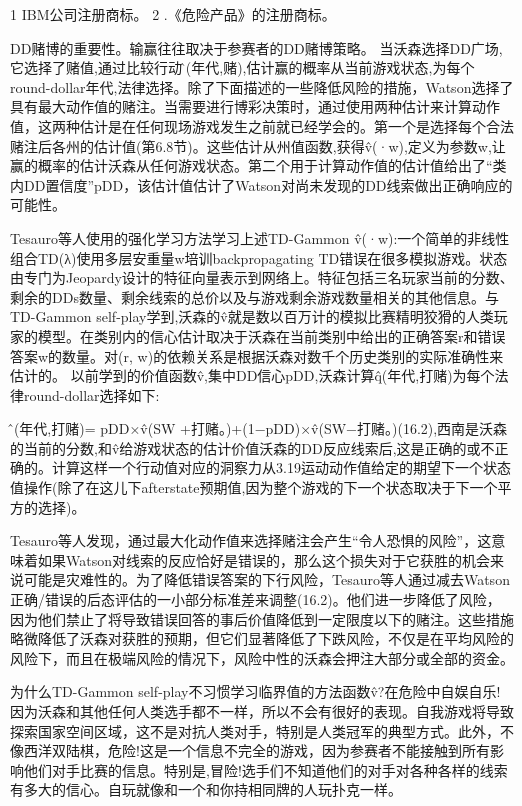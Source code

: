 1 IBM公司注册商标。
2 .《危险产品》的注册商标。

DD赌博的重要性。输赢往往取决于参赛者的DD赌博策略。
当沃森选择DD广场,它选择了赌值,通过比较行动问̂(年代,赌),估计赢的概率从当前游戏状态,为每个round-dollar年代,法律选择。除了下面描述的一些降低风险的措施，Watson选择了具有最大动作值的赌注。当需要进行博彩决策时，通过使用两种估计来计算动作值，这两种估计是在任何现场游戏发生之前就已经学会的。第一个是选择每个合法赌注后各州的估计值(第6.8节)。这些估计从州值函数,获得v̂(·w),定义为参数w,让赢的概率的估计沃森从任何游戏状态。第二个用于计算动作值的估计值给出了“类内DD置信度”pDD，该估计值估计了Watson对尚未发现的DD线索做出正确响应的可能性。

Tesauro等人使用的强化学习方法学习上述TD-Gammon v̂(·w):一个简单的非线性组合TD(λ)使用多层安重量w培训backpropagating TD错误在很多模拟游戏。状态由专门为Jeopardy设计的特征向量表示到网络上。特征包括三名玩家当前的分数、剩余的DDs数量、剩余线索的总价以及与游戏剩余游戏数量相关的其他信息。与TD-Gammon self-play学到,沃森的v̂就是数以百万计的模拟比赛精明狡猾的人类玩家的模型。在类别内的信心估计取决于沃森在当前类别中给出的正确答案r和错误答案w的数量。对(r, w)的依赖关系是根据沃森对数千个历史类别的实际准确性来估计的。
以前学到的价值函数v̂,集中DD信心pDD,沃森计算q̂(年代,打赌)为每个法律round-dollar选择如下:

问̂(年代,打赌)= pDD×v̂(SW +打赌。)+(1−pDD)×v̂(SW−打赌。)(16.2),西南是沃森的当前的分数,和v̂给游戏状态的估计价值沃森的DD反应线索后,这是正确的或不正确的。计算这样一个行动值对应的洞察力从3.19运动动作值给定的期望下一个状态值操作(除了在这儿下afterstate预期值,因为整个游戏的下一个状态取决于下一个平方的选择)。

Tesauro等人发现，通过最大化动作值来选择赌注会产生“令人恐惧的风险”，这意味着如果Watson对线索的反应恰好是错误的，那么这个损失对于它获胜的机会来说可能是灾难性的。为了降低错误答案的下行风险，Tesauro等人通过减去Watson正确/错误的后态评估的一小部分标准差来调整(16.2)。他们进一步降低了风险，因为他们禁止了将导致错误回答的事后价值降低到一定限度以下的赌注。这些措施略微降低了沃森对获胜的预期，但它们显著降低了下跌风险，不仅是在平均风险的风险下，而且在极端风险的情况下，风险中性的沃森会押注大部分或全部的资金。

为什么TD-Gammon self-play不习惯学习临界值的方法函数v̂?在危险中自娱自乐!因为沃森和其他任何人类选手都不一样，所以不会有很好的表现。自我游戏将导致探索国家空间区域，这不是对抗人类对手，特别是人类冠军的典型方式。此外，不像西洋双陆棋，危险!这是一个信息不完全的游戏，因为参赛者不能接触到所有影响他们对手比赛的信息。特别是,冒险!选手们不知道他们的对手对各种各样的线索有多大的信心。自玩就像和一个和你持相同牌的人玩扑克一样。

